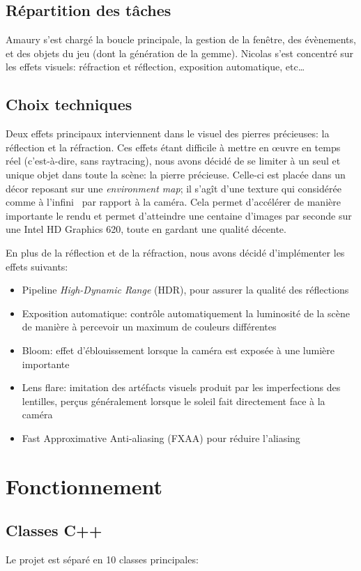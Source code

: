 \documentclass[a4paper,12pt]{article}
\begin{document}
\subsection{Répartition des tâches}
Amaury s'est chargé la boucle principale, la gestion de la fenêtre, des évènements, et des objets du jeu
(dont la génération de la gemme). Nicolas s'est concentré sur les effets visuels: réfraction et réflection,
exposition automatique, etc\ldots

\subsection{Choix techniques}
Deux effets principaux interviennent dans le visuel des pierres précieuses: la réflection et la réfraction.
Ces effets étant difficile à mettre en œuvre en temps réel (c'est-à-dire, sans raytracing), nous avons décidé
de se limiter à un seul et unique objet dans toute la scène: la pierre précieuse. Celle-ci est placée dans un
décor reposant sur une \emph{environment map}; il s'agît d'une texture qui considérée comme \og à l'infini \fg
\ par rapport à la caméra. Cela permet d'accélérer de manière importante le rendu et permet d'atteindre une
centaine d'images par seconde sur une Intel HD Graphics 620, toute en gardant une qualité décente.

En plus de la réflection et de la réfraction, nous avons décidé d'implémenter les effets suivants:
\begin{itemize}
    \item Pipeline \emph{High-Dynamic Range} (HDR), pour assurer la qualité des réflections
    \item Exposition automatique: contrôle automatiquement la luminosité de la scène de manière à percevoir un maximum de couleurs différentes
    \item Bloom: effet d'éblouissement lorsque la caméra est exposée à une lumière importante
    \item Lens flare: imitation des artéfacts visuels produit par les imperfections des lentilles, perçus généralement lorsque le soleil fait directement face à la caméra
    \item Fast Approximative Anti-aliasing (FXAA) pour réduire \og l'aliasing \fg
\end{itemize}

\section{Fonctionnement}
\subsection{Classes C++}
Le projet est séparé en 10 classes principales:
\end{document}
